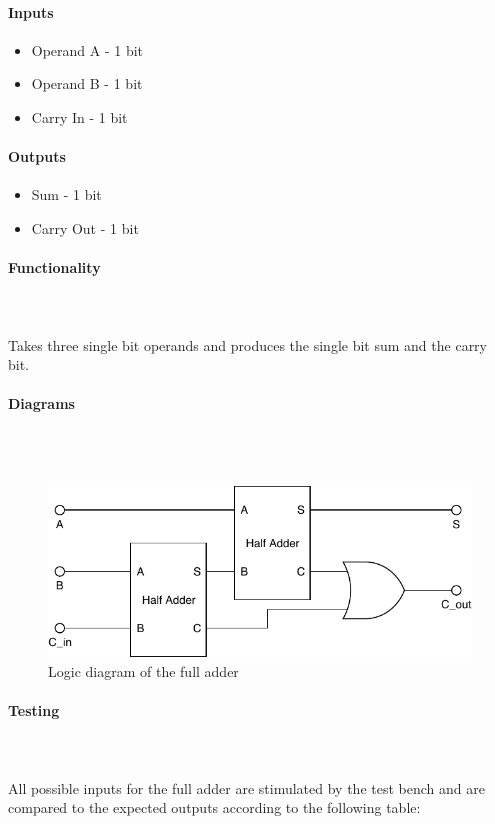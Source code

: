 \documentclass{article}
\begin{document}
    \paragraph{Inputs}
    \begin{itemize}
        \item Operand A - 1 bit
        \item Operand B - 1 bit
        \item Carry In - 1 bit
    \end{itemize}

    \paragraph{Outputs}
    \begin{itemize}
        \item Sum - 1 bit
        \item Carry Out - 1 bit
    \end{itemize}

    \paragraph{Functionality}
    \hfill\\\\
    Takes three single bit operands and produces the single bit sum and the
    carry bit.

    \paragraph{Diagrams}
    \hfill\\\\
    \begin{figure}[H]
        \centering
        \includegraphics{../diagrams/alu/adder/full_adder.pdf}
        \caption{Logic diagram of the full adder}
    \end{figure}

    \paragraph{Testing}
    \hfill\\\\
    All possible inputs for the full adder are stimulated by the test bench
    and are compared to the expected outputs according to the following
    table:
\end{document}
